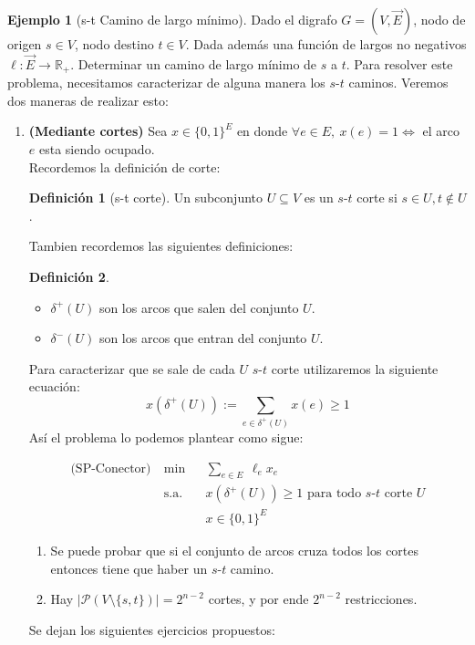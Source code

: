\documentclass[10pt]{article}
\newcommand{\RR}{\mathbb R}
\theoremstyle{plain}
\theoremstyle{definition}
\newtheorem{defi}{Definición}
\newtheorem{eje}{Ejemplo}
\begin{document}
\begin{eje}[s-t Camino de largo mínimo] Dado el digrafo $G=(V,\Vec{E})$, nodo de origen $s \in V$, nodo destino $t \in V$. Dada además una función de largos no negativos $\ell: \Vec{E} \to \RR_{+}$. Determinar un camino de largo mínimo de $s$ a $t$. Para resolver este problema, necesitamos caracterizar de alguna manera los $s$-$t$ caminos.  Veremos dos maneras de realizar esto:
\begin{enumerate}[\bf I.-]
    \item \textbf{(Mediante cortes)} Sea $x\in \{0,1\}^E$ en donde $\forall e\in E, ~x(e)=1 \iff$ el arco $e$ esta siendo ocupado.\\
    Recordemos la definición de corte:
    \begin{defi}[s-t corte] Un subconjunto $U \subseteq V$ es un $s$-$t$ corte si $s \in U, t \not \in U$. 
    \end{defi}
    Tambien recordemos las siguientes definiciones:
    \begin{defi}
    \hphantom{0.5 cm}
    \begin{itemize}
        \item $\delta^{+}(U)$ son los arcos que salen del conjunto $U$.
        \item $\delta^{-}(U)$ son los arcos que entran del conjunto $U$. 
    \end{itemize} 
    \end{defi}
    Para caracterizar que se sale de cada $U$ $s$-$t$ corte utilizaremos la siguiente ecuación:
    $$x(\delta^+(U)):= \sum\limits_{e\in \delta^+(U)} x(e) \geq 1 $$
    Así el problema lo podemos plantear como sigue:

\begin{equation*}
\begin{aligned}
\textrm{(SP-Conector)}~ & \min
& & \displaystyle{\sum_{e \in E}}~\ell_{e}x_{e}\\
& \text{s.a.}
& & x\left(\delta^{+}(U)\right) \geq 1 \text{ para todo }s\text{-}t \text{ corte } U \\
&&& x \in\{0,1\}^{E}
\end{aligned}
\end{equation*}


\begin{enumerate}
    \item Se puede probar que si el conjunto de arcos cruza todos los cortes entonces tiene que haber un $s$-$t$ camino.
    \item Hay $|\mathcal{P}(V\setminus\{s,t\})|=2^{n-2}$ cortes, y por ende $2^{n-2}$ restricciones.
\end{enumerate}
Se dejan los siguientes ejercicios propuestos:


\end{enumerate}
\end{eje}
\end{document}
